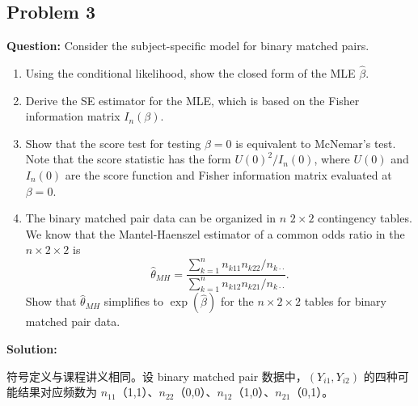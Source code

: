 \subsection{Problem 3}

\textbf{Question:} Consider the subject-specific model for binary matched pairs.
\begin{enumerate}[label=(\alph*)]
  \item Using the conditional likelihood, show the closed form of the MLE $\widehat{\beta}$.
  \item Derive the SE estimator for the MLE, which is based on the Fisher information matrix $I_n(\beta)$.
  \item Show that the score test for testing $\beta = 0$ is equivalent to McNemar's test. Note that the score statistic has the form $U(0)^2/I_n(0)$, where $U(0)$ and $I_n(0)$ are the score function and Fisher information matrix evaluated at $\beta = 0$.
  \item The binary matched pair data can be organized in $n$ $2\times 2$ contingency tables. We know that the Mantel-Haenszel estimator of a common odds ratio in the $n\times 2\times 2$ is
  \[
    \widehat{\theta}_{MH} = \frac{\sum_{k=1}^n n_{k11}n_{k22}/n_{k\cdot\cdot}}{\sum_{k=1}^n n_{k12}n_{k21}/n_{k\cdot\cdot}}.
  \]
  Show that $\widehat{\theta}_{MH}$ simplifies to $\exp(\widehat{\beta})$ for the $n\times 2\times 2$ tables for binary matched pair data.
\end{enumerate}

\bigskip
\textbf{Solution:}

符号定义与课程讲义相同。设 binary matched pair 数据中，$(Y_{i1}, Y_{i2})$ 的四种可能结果对应频数为 $n_{11}$（1,1）、$n_{22}$（0,0）、$n_{12}$（1,0）、$n_{21}$（0,1）。

